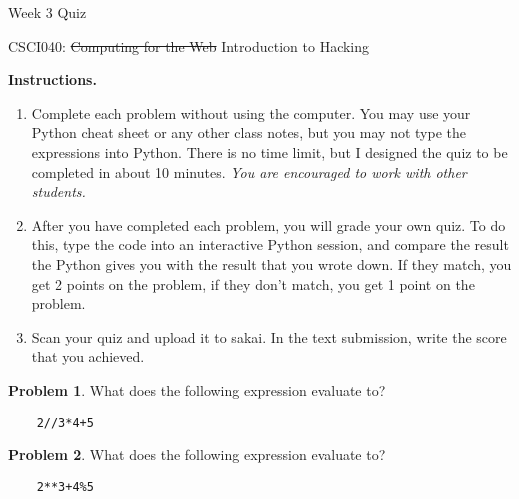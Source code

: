 \documentclass[10pt]{article}
\theoremstyle{definition}
\newtheorem{problem}{Problem}
\begin{document}
\begin{center}
    {
\Large
Week 3 Quiz
}

    \vspace{0.1in}
    CSCI040: \sout{Computing for the Web} Introduction to Hacking

    \vspace{0.1in}
\end{center}

\vspace{0.15in}
%
%

\noindent\textbf{Instructions.}
\begin{enumerate}
    \item
        Complete each problem without using the computer.  
        You may use your Python cheat sheet or any other class notes,
        but you may not type the expressions into Python.
        There is no time limit, but I designed the quiz to be completed in about 10 minutes.
        \emph{You are encouraged to work with other students.}
\item
After you have completed each problem, you will grade your own quiz.
To do this, type the code into an interactive Python session,
and compare the result the Python gives you with the result that you wrote down.
If they match, you get 2 points on the problem,
if they don't match, you get 1 point on the problem.
\item
Scan your quiz and upload it to sakai.
In the text submission, write the score that you achieved.
\end{enumerate}
\vspace{0.15in}

\begin{problem}
    What does the following expression evaluate to?
\end{problem}
\begin{lstlisting}
    2//3*4+5
\end{lstlisting}
\vspace{1.5in}

\begin{problem}
    What does the following expression evaluate to?
\end{problem}
\begin{lstlisting}
    2**3+4%5
\end{lstlisting}
\vspace{1.5in}
\end{document}
